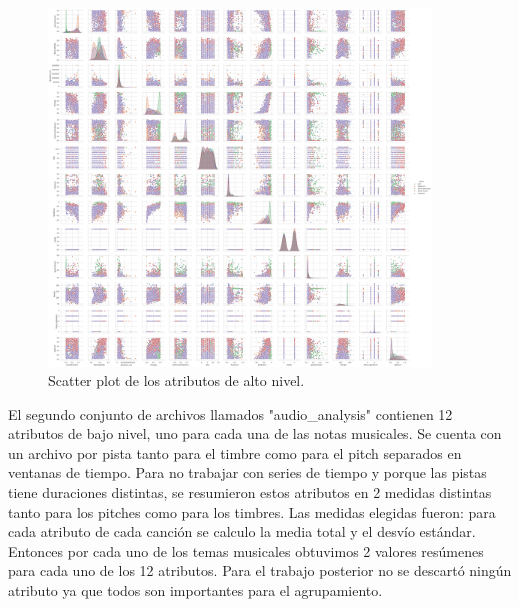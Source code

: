 \documentclass{icisfinal}
\begin{document}
\begin{figure}[H]
    \centering
    \includegraphics[width = 4in]{img/scatter-af-complete.png}
    \caption{Scatter plot de los atributos de alto nivel.}
    \label{fig:scatter-af}
\end{figure}

El segundo conjunto de archivos llamados "audio\_analysis" contienen 12 atributos de bajo nivel, uno para cada una de las notas musicales. Se cuenta con un archivo por pista tanto para el timbre como para el pitch separados en ventanas de tiempo. Para no trabajar con series de tiempo y porque las pistas tiene duraciones distintas, se resumieron estos atributos en 2 medidas distintas tanto para los pitches como para los timbres. Las medidas elegidas fueron: para cada atributo de cada canción se calculo la media total y el desvío estándar. Entonces por cada uno de los temas musicales obtuvimos 2 valores resúmenes para cada uno de los 12 atributos. Para el trabajo posterior no se descartó ningún atributo ya que todos son importantes para el agrupamiento.
\end{document}

